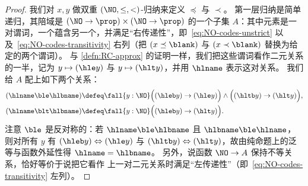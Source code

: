 \begin{proof}
  我们对 $x,y$ 做双重 $(\NO,\le,<)$-归纳来定义 $\preceq$ 与 $\prec$。
  第一层归纳是简单递归，其陪域是 $(\NO\to\prop)\times (\NO\to\prop)$ 的一个子集 $A$：其中元素是一对谓词，一个蕴含另一个，并满足“右传递性”，即~\eqref{eq:NO-codes-unstrict} 以及~\eqref{eq:NO-codes-transitivity} 右列（把 $(x\preceq \blank)$ 与 $(x\prec \blank)$ 替换为给定的两个谓词）。
  与 \cref{defn:RC-approx} 的证明一样，我们把这些谓词看作二元关系的一半，记为 $y\mapsto (\hle y)$ 与 $y\mapsto (\hlt y)$，并用 $\hlname$ 表示这对关系。
  我们给 $A$ 配上如下两个关系：
  \begin{align*}
    (\hlname \ble \hlbname) &\defeq
    \fall{y:\NO} \Big( (\hleb y) \to (\hle y) \Big) \land
    \Big( (\hltb y) \to (\hlt y) \Big),\\
    (\hlname \blt \hlbname) &\defeq
    \fall{y:\NO} \Big( (\hleb y) \to (\hlt y) \Big).
  \end{align*}
  注意 $\ble$ 是反对称的：若 $\hlname \ble \hlbname$ 且 $\hlbname \ble \hlname$，则对所有 $y$ 有 $(\hleb y) \Leftrightarrow (\hle y)$ 与 $(\hltb y) \Leftrightarrow (\hlt y)$，故由纯命题上的泛等与函数外延性得 $\hlname=\hlbname$。
  另外，说函数 $\NO\to A$ 保持不等关系，恰好等价于说把它看作 \NO 上一对二元关系时满足“左传递性”（即~\eqref{eq:NO-codes-transitivity} 左列）。


\end{proof}
